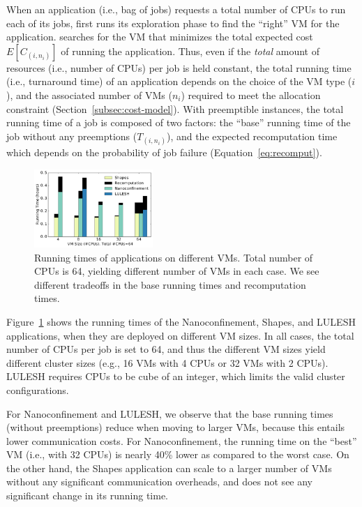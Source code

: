 When an application (i.e., bag of jobs) requests a total number of CPUs to run each of its jobs, \sysname first runs its exploration phase to find the ``right'' VM for the application.
\sysname searches for the VM that minimizes the total expected cost $E[C_{(i,n_i)}]$ of running the application. %
Thus, even if the \emph{total} amount of resources (i.e., number of CPUs) per job is held constant, the total running time (i.e., turnaround time) of an application depends on the choice of the VM type ($i$), and the associated number of VMs ($n_i$) required to meet the allocation constraint (Section~\ref{subsec:cost-model}).
%
With preemptible instances, the total running time of a job is composed of two factors: the ``base'' running time of the job without any preemptions ($T_{(i,n_i)}$), and the expected recomputation time which depends on the probability of job failure (Equation~\ref{eq:recomput}). 

\begin{figure}
  \centering
  \includegraphics[width=0.4\textwidth]{../graphs/runtime-bars.pdf}
      \vspace*{\myfigspace}
  \caption{Running times of applications on different VMs. Total number of CPUs is 64, yielding different number of VMs in each case. We see different tradeoffs in the base running times and recomputation times.}
  \label{fig:runtimes-bar}
    \vspace*{\myfigspace}
\end{figure}


Figure~\ref{fig:runtimes-bar} shows the running times of the Nanoconfinement, Shapes, and LULESH applications, when they are deployed on different VM sizes. 
In all cases, the total number of CPUs per job is set to 64, and thus the different VM sizes yield different cluster sizes (e.g., 16 VMs with 4 CPUs or 32 VMs with 2 CPUs).
LULESH requires CPUs to be cube of an integer, which limits the valid cluster configurations. 

For Nanoconfinement and LULESH, we observe that the base running times (without preemptions) reduce when moving to larger VMs, because this entails lower communication costs.
For Nanoconfinement, the running time on the ``best'' VM (i.e., with 32 CPUs) is nearly 40\% lower as compared to the worst case. 
On the other hand, the Shapes application can scale to a larger number of VMs without any significant communication overheads, and does not see any significant change in its running time. 

